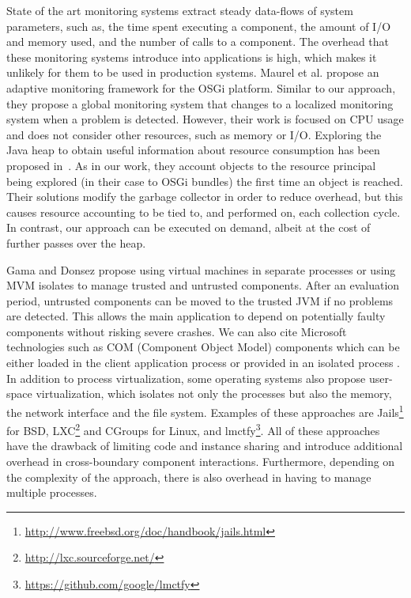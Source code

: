 State of the art monitoring systems \cite{FrenotS04,KregerHaroldWilliamson03,Binder200645} extract steady data-flows of system parameters, such as, the time spent executing a component, the amount of I/O and memory used, and the number of calls to a component.
The overhead that these monitoring systems introduce into applications is high, which makes it unlikely for them to be used in production systems.
Maurel et al. \cite{Maurel:2012:AME:2304736.2304763} propose an adaptive monitoring framework for the OSGi platform.
Similar to our approach, they propose a global monitoring system that changes to a localized monitoring system when a problem is detected.
However, their work is focused on CPU usage and does not consider other resources, such as memory or I/O.
Exploring the Java heap to obtain useful information about resource consumption has been proposed in~\cite{Price:2003:GCM:829515.830545, Geoffray5270296}.
As in our work, they account objects to the resource principal being explored (in their case to OSGi bundles) the first time an object is reached.
Their solutions modify the garbage collector in order to reduce overhead, but this causes resource accounting to be tied to, and performed on, each collection cycle.
In contrast, our approach can be executed on demand, albeit at the cost of further passes over the heap.

Gama and Donsez \cite{Gama:2010:SCS:2176905.2176915} propose using virtual machines in separate processes or using MVM isolates \cite{czajkowski2012multitasking} to manage trusted and untrusted components.
After an evaluation period, untrusted components can be moved to the trusted JVM if no problems are detected.
This allows the main application to depend on potentially faulty components without risking severe crashes.
We can also cite Microsoft technologies such as COM (Component Object Model) components which can be either loaded in the client application process or provided in an isolated process \cite{lowy2001and}.
In addition to process virtualization, some operating systems also propose user-space virtualization, which isolates not only the processes but also the memory, the network interface and the file system. Examples of these approaches are Jails\footnote{\url{http://www.freebsd.org/doc/handbook/jails.html}} for BSD, LXC\footnote{\url{http://lxc.sourceforge.net/}} and CGroups for Linux, and lmctfy\footnote{\url{https://github.com/google/lmctfy}}.
All of these approaches have the drawback of limiting code and instance sharing and introduce additional overhead in cross-boundary component interactions.
Furthermore, depending on the complexity of the approach, there is also overhead in having to manage multiple processes.